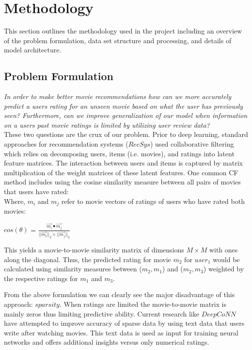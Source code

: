 \documentclass[10pt,twocolumn,letterpaper]{article}
\begin{document}
\section{Methodology}
This section outlines the methodology used in the project including an overview of the problem formulation, data set structure and processing, and details of model architecture.

\subsection{Problem Formulation}

\textit{In order to make better movie recommendations how can we more accurately predict a users rating for an unseen movie based on what the user has previously seen? Furthermore, can we improve generalization of our model when information on a users past movie ratings is limited by utilizing user review data?}\\

These two questions are the crux of our problem. Prior to deep learning, standard approaches for recommendation systems ($RecSys$) used collaborative filtering which relies on decomposing users, items (i.e. movies), and ratings into latent feature matrices. The interaction between users and items is captured by matrix multiplication of the weight matrices of these latent features. One common CF method includes using the cosine similarity measure between all pairs of movies that users have rated:\\

Where,
$m_{i}$ and $m_{j}$ refer to movie vectors of ratings of users who have rated both movies:

\begin{center}
\textbf{$cos(\theta)$} =
$\frac{\vec{m_{i}} \bullet \vec{m_{j}}}{||\vec{m_{i}}||_2 \times ||\vec{m_{j}}||_2}$
\end{center}

This yields a movie-to-movie similarity matrix of dimensions $M \times M$ with ones along the diagonal. Thus, the predicted rating for movie $m_{2}$ for $user_1$ would be calculated using similarity measures between ($m_2,m_1$) and ($m_2,m_3$) weighted by the respective ratings for $m_1$ and $m_3$. 

From the above formulation we can clearly see the major disadvantage of this approach: $sparsity$. When ratings are limited the movie-to-movie matrix is mainly zeros thus limiting predictive ability. Current research like $DeepCoNN$ have attempted to improve accuracy of sparse data by using text data that users write after watching movies. This text data is used as input for training neural networks and offers additional insights versus only numerical ratings.
\end{document}
